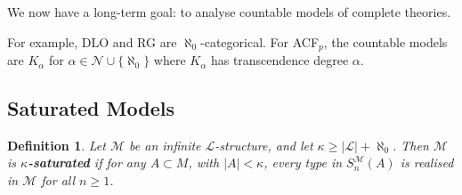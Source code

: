 \documentclass[]{article}
\theoremstyle{custhm}
\theoremstyle{cusdef}
\newtheorem{defin}[theorem]{Definition}
\theoremstyle{custhm}
\theoremstyle{custhm}
\theoremstyle{custhm}
\theoremstyle{ex}
\theoremstyle{custhm}
\theoremstyle{cusdef}
\theoremstyle{remark}
\theoremstyle{remark}
\newcommand{\undf}[1]{\textit{\textbf{#1}}}
\renewcommand{\L}{\mathcal{L}}
\newcommand{\M}{\mathcal{M}}
\newcommand{\N}{\mathcal{N}}
\newcommand{\sman}{S_n^\M(A)}
\begin{document}
We now have a long-term goal: to analyse countable models of complete theories.

For example, DLO and RG are $\aleph_0$-categorical. For ACF$_p$, the countable models are $K_\alpha$ for $\alpha \in \N\cup\{\aleph_0\}$ where $K_\alpha$ has transcendence degree $\alpha$.

\subsection*{Saturated Models}

\begin{defin}
Let $\M$ be an infinite $\L$-structure, and let $\kappa \ge |\L| + \aleph_0$. Then $\M$ is \undf{$\kappa$-saturated} if for any $A\subset M$, with $|A| < \kappa$, every type in $\sman$ is realised in $\M$ for all $n\ge 1$.
\end{defin}
\end{document}

